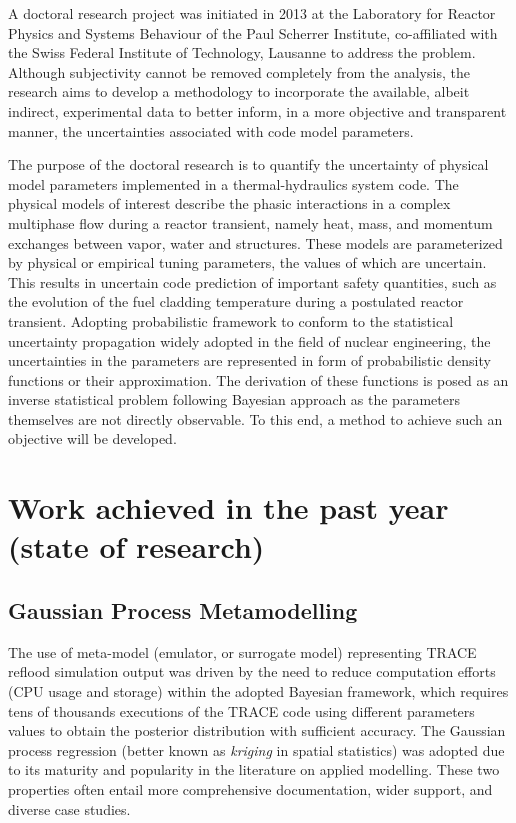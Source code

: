 \documentclass[11pt,titlepage]{article}
\begin{document}
A doctoral research project was initiated in 2013 at the Laboratory for 
Reactor Physics and Systems Behaviour of the Paul Scherrer Institute, 
co-affiliated with the Swiss Federal Institute of Technology, Lausanne 
to address the problem. 
Although subjectivity cannot be removed completely from the analysis,
the research aims to develop  a methodology to incorporate the available, 
albeit indirect, experimental data to better inform, in a more objective 
and transparent manner, the uncertainties associated with code model parameters.

The purpose of the doctoral research is to quantify the uncertainty of physical 
model parameters implemented in a thermal-hydraulics system code. 
The physical models of interest describe the phasic interactions in a complex 
multiphase flow during a reactor transient, namely heat, mass, and momentum 
exchanges between vapor, water and structures. 
These models are parameterized 
by physical or empirical tuning parameters, the values of which are uncertain. 
This results in uncertain code prediction of important safety quantities, such 
as the evolution of the fuel cladding temperature during a postulated reactor 
transient.
Adopting probabilistic framework to conform to the statistical uncertainty 
propagation widely adopted in the field of nuclear engineering, 
the uncertainties in the parameters are represented in form of probabilistic 
density functions or their approximation. The derivation of these functions 
is posed as an inverse statistical problem following Bayesian approach as 
the parameters themselves are not directly observable. 
To this end, a method to achieve such an objective will be developed.

\section{Work achieved in the past year (state of research)}

\subsection{Gaussian Process Metamodelling}

The use of meta-model (emulator, or surrogate model) representing TRACE reflood
simulation output was driven by the need to reduce computation efforts 
(CPU usage and storage) within the adopted Bayesian framework, which requires 
tens of thousands executions of the TRACE code using different parameters 
values to obtain the posterior distribution with sufficient accuracy. 
The Gaussian process regression (better known as \emph{kriging} in spatial 
statistics) was adopted due to its maturity and popularity in the literature 
on applied modelling. These two properties often entail more comprehensive 
documentation, wider support, and diverse case studies.
\end{document}
